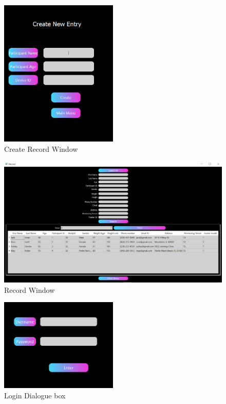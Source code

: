 \documentclass[12pt, titlepage]{article}
\begin{document}
\begin{figure}[h!]
	\begin{center}
		 \includegraphics[width=0.5\textwidth]{CreateRecord}
		\caption{Create Record Window}
		\label{CreateRecord} 
	\end{center}
\end{figure}

\begin{figure}[h!]
	\begin{center}
		 \includegraphics[width=1\textwidth]{Record}
		\caption{Record Window}
		\label{Record} 
	\end{center}
\end{figure}

\begin{figure}[h!]
	\begin{center}
		 \includegraphics[width=0.5\textwidth]{login}
		\caption{Login Dialogue box}
		\label{Login} 
	\end{center}
\end{figure}
\end{document}
